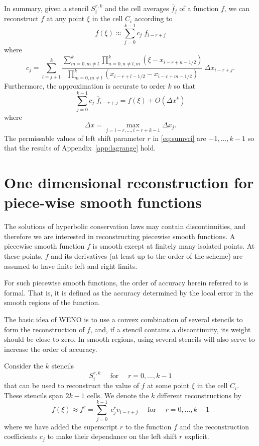 \documentclass{article}
\newcommand{\for}[0]{\quad \text{ for } \quad}
\numberwithin{equation}{section}
\begin{document}
In summary, given a stencil $S_i^{r,k}$ and the cell averages
$\overline{f}_j$ of a function $f$, we can reconstruct $f$ at any
point $\xi$ in the cell $C_i$ according to
\begin{equation}
  \label{eq:sumvri}
  f(\xi) \approx \sum_{j=0}^{k-1} c_j\; \overline{f}_{i-r+j}
\end{equation}
where
\begin{equation}
  c_j = \sum_{l=j+1}^k \frac{\sum_{m=0, m \neq l}^{k}
    \prod_{n=0, n \neq l,m}^{k} (\xi - x_{i-r+n-1/2})}{
    \prod_{m=0, m \neq l}^{k} (x_{i-r+l-1/2} - x_{i-r+m-1/2})}
  \ \Delta x_{i-r+j}.
\end{equation}
Furthermore, the approximation is accurate to order $k$ so that
\begin{equation*}
  \sum_{j=0}^{k-1} c_j\; \overline{f}_{i-r+j} = f(\xi) + O(\Delta x^k)
\end{equation*}
where
\begin{equation*}
  \Delta x = \max_{j=i-r,\ldots,i-r+k-1} \Delta x_j.
\end{equation*}
The permissable values of left shift parameter $r$ in
\eqref{eq:sumvri} are $-1,\ldots,k-1$ so that the results of
Appendix~\ref{app:lagrange} hold.

\newpage
\section{One dimensional reconstruction for piece-wise smooth functions}

The solutions of hyperbolic conservation laws may contain
discontinuities, and therefore we are interested in reconstructing
piecewise smooth functions.  A piecewise smooth function $f$ is smooth
except at finitely many isolated points.  At these points, $f$ and its
derivatives (at least up to the order of the scheme) are assumed to
have finite left and right limits.

For such piecewise smooth functions, the order of accuracy herein
referred to is formal.  That is, it is defined as the accuracy
determined by the local error in the smooth regions of the function.

The basic idea of WENO is to use a convex combination of several
stencils to form the reconstruction of $f$, and, if a stencil contains
a discontinuity, its weight should be close to zero.  In smooth
regions, using several stencils will also serve to increase the order
of accuracy.

Consider the $k$ stencils
\begin{equation*}
  S_i^{r,k} \for r=0,\ldots,k-1
\end{equation*}
that can be used to reconstruct the value of $f$ at some point $\xi$
in the cell $C_i$.  These stencils span $2k-1$ cells.  We denote the
$k$ different reconstructions by
\begin{equation}
  \label{eq:fr}
  f(\xi) \approx f^r = \sum_{j=0}^{k-1}\; c^r_j \bar{v}_{i-r+j} \for r=0,\dots,k-1
\end{equation}
where we have added the superscript $r$ to the function $f$ and the
reconstruction coefficients $c_j$ to make their dependance on the left
shift $r$ explicit.
\end{document}
